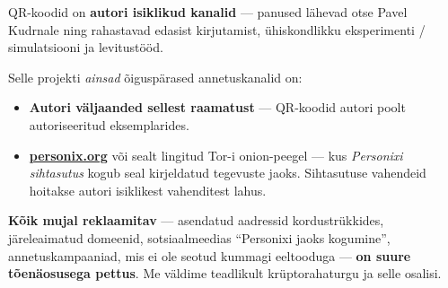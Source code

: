 \begin{minipage}[t]{0.60\textwidth}
\vspace{0pt}
\begin{mdframed}[
  linewidth=0.7pt,roundcorner=5pt,
  innerleftmargin=10pt,innerrightmargin=10pt,
  innertopmargin=8pt,innerbottommargin=8pt,
  skipabove=0pt,skipbelow=0pt,
  linecolor=cbwarning!50,backgroundcolor=cbwarning!5,
  nobreak=true,
  needspace=4\baselineskip,
]
\footnotesize
QR-koodid on \textbf{autori isiklikud kanalid} --- panused lähevad otse Pavel Kudrnale ning rahastavad edasist kirjutamist, ühiskondlikku eksperimenti / simulatsiooni ja levitustööd.

\smallskip
Selle projekti \emph{ainsad} õiguspärased annetuskanalid on:

\smallskip
\begin{itemize}
\setlength{\itemsep}{0pt}
\setlength{\topsep}{0pt}
\item \textbf{Autori väljaanded sellest raamatust} --- QR-koodid autori poolt autoriseeritud eksemplarides.
\item \href{https://personix.org}{\textbf{personix.org}} või sealt lingitud Tor-i onion-peegel --- kus \emph{Personixi sihtasutus} kogub seal kirjeldatud tegevuste jaoks. Sihtasutuse vahendeid hoitakse autori isiklikest vahenditest lahus.
\end{itemize}

\smallskip
\textbf{Kõik mujal reklaamitav} --- asendatud aadressid kordustrükkides, järeleaimatud domeenid, sotsiaalmeedias ``Personixi jaoks kogumine'', annetuskampaaniad, mis ei ole seotud kummagi eeltooduga --- \textbf{on suure tõenäosusega pettus}. Me väldime teadlikult krüptorahaturgu ja selle osalisi.
\end{mdframed}
\end{minipage}

\clearpage
